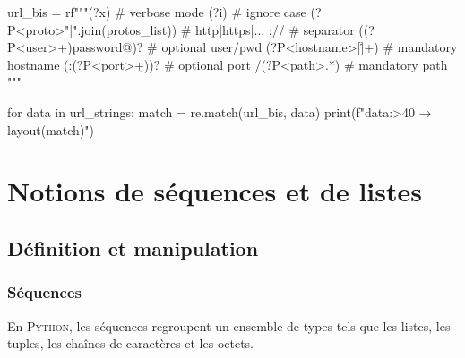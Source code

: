 \begin{solution}
\begin{idleconsole}
\begin{pyconsole}
url_bis = rf"""(?x)                    # verbose mode
    (?i)                               # ignore case
    (?P<proto>{"|".join(protos_list)}) # http|https|...
    ://                                # separator
    ((?P<user>\w+){password}@)?        # optional user/pwd
    (?P<hostname>[\w\.]+)              # mandatory hostname
    (:(?P<port>\d+))?                  # optional port
    /(?P<path>.*)                      # mandatory path
"""

for data in url_strings:
    match = re.match(url_bis, data)
    print(f"{data:>40} → {layout(match)}")

	\end{pyconsole}
\end{idleconsole}

\end{solution}

\section[Notions de séquences et de listes]{Notions de séquences et de listes}
\label{sec:XI.2}

\subsection[Définition et manipulation]{Définition et manipulation}
\label{sub:XI.2.1}


\subsubsection[Séquences]{Séquences}
\label{subsub:XI.2.1.1}

En \textsc{Python}, les séquences regroupent un ensemble de types tels que les listes, les tuples, les chaînes de caractères et les octets. %


